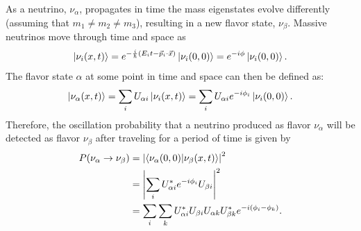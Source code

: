 As a neutrino, $\nu_\alpha$, propagates in time the mass eigenstates evolve differently (assuming that $m_{1} \neq m_{2} \neq m_{3}$), resulting in a new flavor state, $\nu_{\beta}$.
Massive neutrinos move through time and space as
\begin{equation}
	\ket{\nu_i(x,t)} = e^{-\frac{i}{\hbar}(E_{i}t-\vec{p}_{i}\cdot\vec{x})}\ket{\nu_i(0,0)} = e^{-i\phi}\ket{\nu_i(0,0)}.
\end{equation}
The flavor state $\alpha$ at some point in time and space can then be defined as:
\begin{equation}
	\ket{\nu_{\alpha}(x,t)} = \sum_{i}U_{\alpha i}\ket{\nu_{i}(x,t)} = \sum_{i}U_{\alpha i}e^{-i\phi_{i}}\ket{\nu_{i}(0,0)}.
\end{equation}
Therefore, the oscillation probability that a neutrino produced as flavor $\nu_\alpha$ will be detected as flavor $\nu_\beta$ after traveling for a period of time is given by 
\begin{equation}	
\begin{split}
	P(\nu_\alpha \rightarrow \nu_\beta) &= \abs{\bra{\nu_\alpha(0,0)}\ket{\nu_\beta(x,t)}}^2 \\
	&=\abs{\sum_{i}U^{*}_{\alpha i}e^{-i\phi_i}U_{\beta i}}^2 \\
	&=\sum_{i}\sum_{k}U^{*}_{\alpha i}U_{\beta i}U_{\alpha k}U^{*}_{\beta k}e^{-i(\phi_{i}-\phi_{k})}.
\end{split}
\end{equation}

